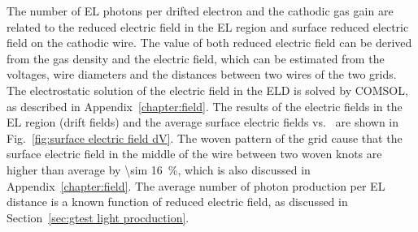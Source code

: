 The number of EL photons per drifted electron and the cathodic gas gain are related to the reduced electric field in the EL region and surface reduced electric field on the cathodic wire. The value of both reduced electric field can be derived from the gas density and the electric field, which can be estimated from the voltages, wire diameters and the distances between two wires of the two grids. The electrostatic solution of the electric field in the ELD is solved by COMSOL, as described in Appendix~\ref{chapter:field}. The results of the electric fields in the EL region (drift fields) and the average surface electric fields vs. \opdv\ are shown in Fig.~\ref{fig:surface electric field dV}.  The woven pattern of the grid cause that the surface electric field in the middle of the wire between two woven knots are higher than average by \SI{\sim 16}{\percent}, which is also discussed in Appendix~\ref{chapter:field}. The average number of photon production per EL distance is a known function of reduced electric field, as discussed in Section~\ref{sec:gtest light procduction}.%
